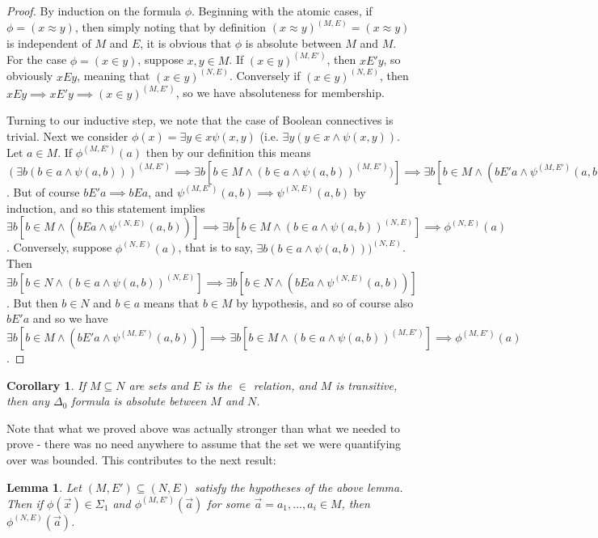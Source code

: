 \documentclass{article}
\theoremstyle{definition}
\theoremstyle{plain}
\theoremstyle{theorem}
\newtheorem{lemma}{Lemma}[section]
\newtheorem{corollary}{Corollary}[section]
\begin{document}
\begin{proof}
	By induction on the formula $\phi$. Beginning with the atomic cases, if $\phi = (x \approx y)$, then simply noting that by definition $(x \approx y)^{(M,E)} = (x \approx y)$ is independent of $M$ and $E$, it is obvious that $\phi$ is absolute between $M$ and $M$. For the case $\phi = (x \in y)$, suppose $x,y \in M$. If $(x \in y)^{(M,E')}$, then $xE'y$, so obviously $xEy$, meaning that $(x \in y)^{(N,E)}$. Conversely if $(x \in y)^{(N,E)}$, then $xEy \implies xE'y \implies (x \in y)^{(M,E')}$, so we have absoluteness for membership. 
	\par Turning to our inductive step, we note that the case of Boolean connectives is trivial. Next we consider $\phi(x) = \exists y \in x \psi(x,y)$ (i.e. $\exists y (y \in x \wedge \psi(x,y))$. Let $a \in M$. If $\phi^{(M,E')}(a)$ then by our definition this means $(\exists b(b \in a \wedge \psi(a,b)))^{(M,E')} \implies \exists b [b \in M \wedge (b \in a \wedge \psi(a,b))^{(M,E')})] \implies \exists b [b \in M \wedge (bE'a \wedge \psi^{(M,E')}(a,b))]$. But of course $bE'a \implies bEa$, and $\psi^{(M,E')}(a,b) \implies \psi^{(N,E)}(a,b)$ by induction, and so this statement implies $\exists b [b \in M \wedge (bEa \wedge \psi^{(N,E)}(a,b))] \implies \exists b[b \in M \wedge (b \in a \wedge \psi(a,b))^{(N,E)}] \implies \phi^{(N,E)}(a)$. Conversely, suppose $\phi^{(N,E)}(a)$, that is to say, $\exists b(b \in a \wedge \psi(a,b)))^{(N,E)}$. Then $\exists b [b \in N \wedge (b \in a \wedge \psi(a,b))^{(N,E)}] \implies \exists b [b \in N \wedge (bEa \wedge \psi^{(N,E)}(a,b))]$. But then $b \in N$ and $b \in a$ means that $b \in M$ by hypothesis, and so of course also $bE'a$ and so we have $\exists b [b \in M \wedge (bE'a \wedge \psi^{(M,E')}(a,b))] \implies \exists b [b \in M \wedge (b \in a \wedge \psi(a,b))^{(M,E')}] \implies \phi^{(M,E')}(a)$. 
\end{proof}
\begin{corollary}
	If $M \subseteq N$ are sets and $E$ is the $\in$ relation, and $M$ is transitive, then any $\Delta_0$ formula is absolute between $M$ and $N$.
\end{corollary}
Note that what we proved above was actually stronger than what we needed to prove - there was no need anywhere to assume that the set we were quantifying over was bounded. This contributes to the next result:
\begin{lemma}
	Let $(M,E') \subseteq (N,E)$ satisfy the hypotheses of the above lemma. Then if $\phi(\vec{x}) \in \Sigma_1$ and $\phi^{(M,E')}(\vec{a})$ for some $\vec{a} = a_1,...,a_i \in M$, then $\phi^{(N,E)}(\vec{a})$. 
\end{lemma} 
\end{document}
